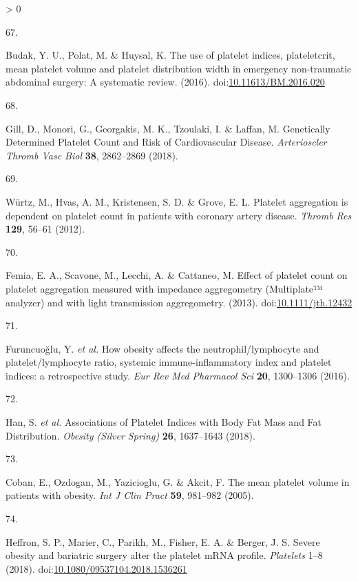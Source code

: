 \documentclass[11pt,twoside]{bristolthesis}
\newlength{\cslhangindent}
\newlength{\csllabelwidth}
\newenvironment{CSLReferences}[2] %
 {%
  \setlength{\parindent}{0pt}
  \ifodd #1 \everypar{\setlength{\hangindent}{\cslhangindent}}\ignorespaces\fi
  \ifnum #2 > 0
  \setlength{\parskip}{#2\baselineskip}
  \fi
 }%
 {}
\newcommand{\CSLLeftMargin}[1]{\parbox[t]{\csllabelwidth}{#1}}
\newcommand{\CSLRightInline}[1]{\parbox[t]{\linewidth - \csllabelwidth}{#1}\break}
\begin{document}
\begin{CSLReferences}{0}{0}
\leavevmode\hypertarget{ref-Budak2016}{}%
\CSLLeftMargin{67. }
\CSLRightInline{Budak, Y. U., Polat, M. \& Huysal, K. {The use of platelet indices, plateletcrit, mean platelet volume and platelet distribution width in emergency non-traumatic abdominal surgery: A systematic review}. (2016). doi:\href{https://doi.org/10.11613/BM.2016.020}{10.11613/BM.2016.020}}

\leavevmode\hypertarget{ref-Gill2018}{}%
\CSLLeftMargin{68. }
\CSLRightInline{Gill, D., Monori, G., Georgakis, M. K., Tzoulaki, I. \& Laffan, M. {Genetically Determined Platelet Count and Risk of Cardiovascular Disease}. \emph{Arterioscler Thromb Vasc Biol} \textbf{38}, 2862--2869 (2018).}

\leavevmode\hypertarget{ref-Wurtz2012}{}%
\CSLLeftMargin{69. }
\CSLRightInline{Würtz, M., Hvas, A. M., Kristensen, S. D. \& Grove, E. L. {Platelet aggregation is dependent on platelet count in patients with coronary artery disease}. \emph{Thromb Res} \textbf{129}, 56--61 (2012).}

\leavevmode\hypertarget{ref-Femia2013}{}%
\CSLLeftMargin{70. }
\CSLRightInline{Femia, E. A., Scavone, M., Lecchi, A. \& Cattaneo, M. {Effect of platelet count on platelet aggregation measured with impedance aggregometry (Multiplate™ analyzer) and with light transmission aggregometry}. (2013). doi:\href{https://doi.org/10.1111/jth.12432}{10.1111/jth.12432}}

\leavevmode\hypertarget{ref-Furuncuoglu2016}{}%
\CSLLeftMargin{71. }
\CSLRightInline{Furuncuoğlu, Y. \emph{et al.} {How obesity affects the neutrophil/lymphocyte and platelet/lymphocyte ratio, systemic immune-inflammatory index and platelet indices: a retrospective study}. \emph{Eur Rev Med Pharmacol Sci} \textbf{20}, 1300--1306 (2016).}

\leavevmode\hypertarget{ref-Han2018a}{}%
\CSLLeftMargin{72. }
\CSLRightInline{Han, S. \emph{et al.} {Associations of Platelet Indices with Body Fat Mass and Fat Distribution}. \emph{Obesity (Silver Spring)} \textbf{26}, 1637--1643 (2018).}

\leavevmode\hypertarget{ref-Coban2005}{}%
\CSLLeftMargin{73. }
\CSLRightInline{Coban, E., Ozdogan, M., Yazicioglu, G. \& Akcit, F. {The mean platelet volume in patients with obesity}. \emph{Int J Clin Pract} \textbf{59}, 981--982 (2005).}

\leavevmode\hypertarget{ref-Heffron2018}{}%
\CSLLeftMargin{74. }
\CSLRightInline{Heffron, S. P., Marier, C., Parikh, M., Fisher, E. A. \& Berger, J. S. {Severe obesity and bariatric surgery alter the platelet mRNA profile}. \emph{Platelets} 1--8 (2018). doi:\href{https://doi.org/10.1080/09537104.2018.1536261}{10.1080/09537104.2018.1536261}}


\end{CSLReferences}
\end{document}
